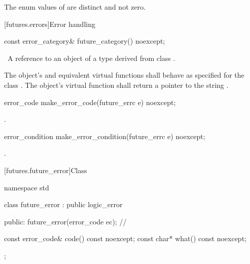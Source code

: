 \pnum
The enum values of  are distinct and not zero.

[futures.errors]{Error handling}

%
\begin{itemdecl}
const error_category& future_category() noexcept;
\end{itemdecl}

\begin{itemdescr}
\pnum
\returns\ A reference to an object of a type derived from class .

\pnum
The object's  and equivalent virtual functions shall
behave as specified for the class . The object's 
virtual function shall return a pointer to the string .
\end{itemdescr}

%
%
\begin{itemdecl}
error_code make_error_code(future_errc e) noexcept;
\end{itemdecl}

\begin{itemdescr}
\pnum
\returns {}.
\end{itemdescr}

%
%
\begin{itemdecl}
error_condition make_error_condition(future_errc e) noexcept;
\end{itemdecl}

\begin{itemdescr}
\pnum
\returns {}.
\end{itemdescr}

[futures.future_error]{Class }

\begin{codeblock}
namespace std {
  class future_error : public logic_error {
  public:
    future_error(error_code ec);  // \expos

    const error_code& code() const noexcept;
    const char*       what() const noexcept;
  };
}
\end{codeblock}

